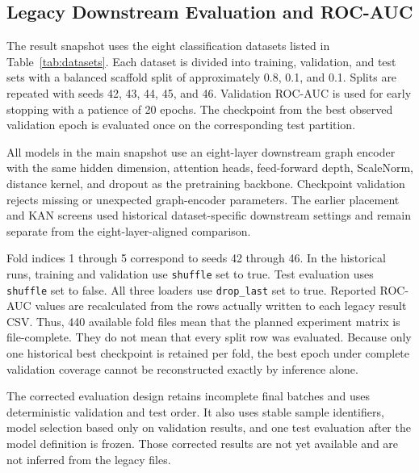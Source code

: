 \documentclass[journal=jcisd8,manuscript=article]{achemso}
\begin{document}
\subsection{Legacy Downstream Evaluation and ROC-AUC}

The result snapshot uses the eight classification datasets listed in
Table~\ref{tab:datasets}. Each dataset is divided into training, validation,
and test sets with a balanced scaffold split of approximately 0.8, 0.1, and
0.1. Splits are repeated with seeds 42, 43, 44, 45, and 46. Validation ROC-AUC
is used for early stopping with a patience of 20 epochs. The checkpoint from
the best observed validation epoch is evaluated once on the corresponding
test partition.

All models in the main snapshot use an eight-layer downstream graph encoder
with the same hidden dimension, attention heads, feed-forward depth,
ScaleNorm, distance kernel, and dropout as the pretraining backbone. Checkpoint
validation rejects missing or unexpected graph-encoder parameters. The earlier
placement and KAN screens used historical dataset-specific downstream settings
and remain separate from the eight-layer-aligned comparison.

Fold indices 1 through 5 correspond to seeds 42 through 46. In the historical
runs, training and validation use \texttt{shuffle} set to true. Test evaluation
uses \texttt{shuffle} set to false. All three loaders use \texttt{drop\_last}
set to true. Reported ROC-AUC values are recalculated from the
rows actually written to each legacy result CSV. Thus, 440 available fold files
mean that the planned experiment matrix is file-complete. They do not mean that
every split row was evaluated. Because only one historical best checkpoint is
retained per fold, the best epoch under complete validation coverage cannot be
reconstructed exactly by inference alone.

The corrected evaluation design retains incomplete final batches and uses
deterministic validation and test order. It also uses stable sample
identifiers, model selection based only on validation results, and one test
evaluation after the model definition is frozen.
Those corrected results are not yet available and are not inferred from the
legacy files.
\end{document}
